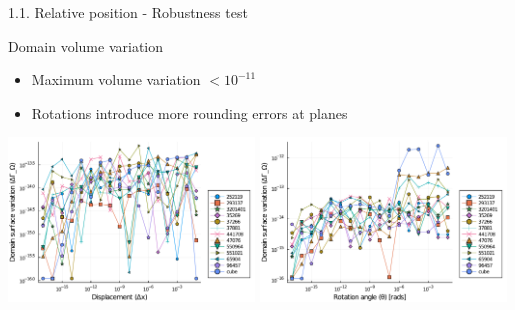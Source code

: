 \documentclass{beamer}
\begin{document}
\begin{frame}{1.1. Relative position - Robustness test}

  \begin{block}{Domain volume variation}
  \begin{itemize}
    \item
      Maximum volume variation $< 10^{-11}$
    \item
      Rotations introduce more rounding errors at planes
  \end{itemize}
  \end{block}

  \includegraphics[width=0.49\textwidth]{../analysis/plots/x_displacement_y_domain_surface}
  \includegraphics[width=0.49\textwidth]{../analysis/plots/x_rotation_y_domain_surface}
\end{frame}
\end{document}
